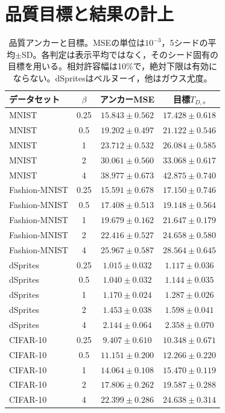 \documentclass[11pt,a4paper]{ltjsarticle}
\begin{document}
\section{品質目標と結果の計上}\label{app:targets}
\begin{table}[H]
\caption{品質アンカーと目標。MSEの単位は$10^{-3}$，5シードの平均$\pm$SD。各判定は表示平均ではなく，そのシード固有の目標を用いる。相対許容幅は10\%で，絶対下限は有効にならない。dSpritesはベルヌーイ，他はガウス尤度。}\label{tab:anchors}
\small
\setlength{\tabcolsep}{3.5pt}
\begin{tabular*}{\textwidth}{@{\extracolsep{\fill}}lccc@{}}
\toprule
データセット & $\beta$ & アンカーMSE & 目標$T_{D,s}$ \\
\midrule
MNIST & 0.25 & $15.843 \pm 0.562$ & $17.428 \pm 0.618$ \\
MNIST & 0.5 & $19.202 \pm 0.497$ & $21.122 \pm 0.546$ \\
MNIST & 1 & $23.712 \pm 0.532$ & $26.084 \pm 0.585$ \\
MNIST & 2 & $30.061 \pm 0.560$ & $33.068 \pm 0.617$ \\
MNIST & 4 & $38.977 \pm 0.673$ & $42.875 \pm 0.740$ \\
Fashion-MNIST & 0.25 & $15.591 \pm 0.678$ & $17.150 \pm 0.746$ \\
Fashion-MNIST & 0.5 & $17.408 \pm 0.513$ & $19.148 \pm 0.564$ \\
Fashion-MNIST & 1 & $19.679 \pm 0.162$ & $21.647 \pm 0.179$ \\
Fashion-MNIST & 2 & $22.416 \pm 0.527$ & $24.658 \pm 0.580$ \\
Fashion-MNIST & 4 & $25.967 \pm 0.587$ & $28.564 \pm 0.645$ \\
dSprites & 0.25 & $1.015 \pm 0.032$ & $1.117 \pm 0.036$ \\
dSprites & 0.5 & $1.040 \pm 0.032$ & $1.144 \pm 0.035$ \\
dSprites & 1 & $1.170 \pm 0.024$ & $1.287 \pm 0.026$ \\
dSprites & 2 & $1.453 \pm 0.038$ & $1.598 \pm 0.041$ \\
dSprites & 4 & $2.144 \pm 0.064$ & $2.358 \pm 0.070$ \\
CIFAR-10 & 0.25 & $9.407 \pm 0.610$ & $10.348 \pm 0.671$ \\
CIFAR-10 & 0.5 & $11.151 \pm 0.200$ & $12.266 \pm 0.220$ \\
CIFAR-10 & 1 & $14.064 \pm 0.108$ & $15.470 \pm 0.119$ \\
CIFAR-10 & 2 & $17.806 \pm 0.262$ & $19.587 \pm 0.288$ \\
CIFAR-10 & 4 & $22.399 \pm 0.286$ & $24.638 \pm 0.314$ \\
\bottomrule
\end{tabular*}
\end{table}
\end{document}
